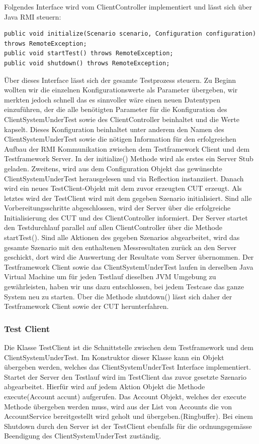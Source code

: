 Folgendes Interface wird vom ClientController implementiert und lässt sich über Java RMI steuern:
\begin{lstlisting}	
public void initialize(Scenario scenario, Configuration configuration) throws RemoteException;
public void startTest() throws RemoteException;
public void shutdown() throws RemoteException;
\end{lstlisting}
Über dieses Interface lässt sich der gesamte Testprozess steuern. Zu Beginn wollten wir die einzelnen Konfigurationswerte als Parameter übergeben, wir merkten jedoch schnell das es sinnvoller wäre einen neuen Datentypen einzuführen, der die alle benötigten Parameter für die Konfiguration des ClientSystemUnderTest sowie des ClientController beinhaltet und die Werte kapselt. Dieses Konfiguration beinhaltet unter anderem den Namen des ClientSystemUnderTest sowie die nötigen Information für den erfolgreichen Aufbau der RMI Kommunikation zwischen dem Testframework Client und dem Testframework Server. In der initialize() Methode wird als erstes ein Server Stub geladen. Zweitens, wird aus dem Configuration Objekt das gewünschte ClientSystemUnderTest herausgelesen und via Reflection instanziiert. Danach wird ein neues TestClient-Objekt mit dem zuvor erzeugten CUT erzeugt. Als letztes wird der TestClient wird mit dem gegeben Szenario initialisiert. Sind alle Vorbereitungsschritte abgeschlossen, wird der Server über die erfolgreiche Initialisierung des CUT und des ClientController informiert. Der Server startet den Testdurchlauf parallel auf allen ClientController über die Methode startTest(). Sind alle Aktionen des gegeben Szenarios abgearbeitet, wird das gesamte Szenario mit den enthaltenen Messresultaten zurück an den Server geschickt, dort wird die Auswertung der Resultate vom Server übernommen. Der Testframework Client sowie das ClientSystemUnderTest laufen in derselben Java Virtual Machine um für jeden Testlauf dieselben JVM Umgebung zu gewährleisten, haben wir uns dazu entschlossen, bei jedem Testcase das ganze System neu zu starten. Über die Methode shutdown() lässt sich daher der Testframework Client sowie der CUT herunterfahren.

\subsubsection{Test Client}
\label{sec:testclient}
Die Klasse TestClient ist die Schnittstelle zwischen dem Testframework und dem ClientSystemUnderTest. Im Konstruktor dieser Klasse kann ein Objekt übergeben werden, welches das ClientSystemUnderTest Interface implementiert. Startet der Server den Testlauf wird im TestClient das zuvor gesetzte Szenario abgearbeitet. Hierfür wird auf jedem Aktion Objekt die Methode execute(Account accunt) aufgerufen. Das Account Objekt, welches der execute Methode übergeben werden muss, wird aus der List von Accounts die von AccountService bereitgestellt wird geholt und übergeben.(Ringbuffer). Bei einem Shutdown durch den Server ist der TestClient ebenfalls für die ordnungsgemässe Beendigung des ClientSystemUnderTest zuständig.

